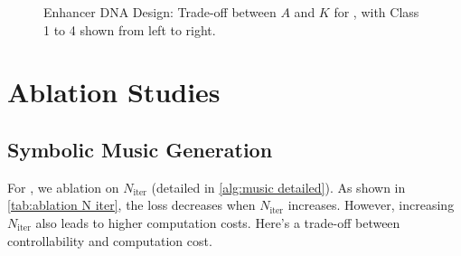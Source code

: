 \begin{figure}[ht]
    \centering
    \hspace{0.01cm}
    \hspace{0.01cm}
     \hspace{0.01cm}
    \caption{Enhancer DNA Design: Trade-off between $A$ and $K$ for \xtsampling, with Class 1 to 4 shown from left to right. }
    \label{fig:app DNA trade-off xt sampling}
\end{figure}























\section{Ablation Studies}
\subsection{Symbolic Music Generation}

For \xcleansampling, we ablation on $N_{\text{iter}}$ (detailed in \cref{alg:music detailed}). As shown in \cref{tab:ablation N iter}, the loss decreases when $N_{\text{iter}}$ increases. However, increasing $N_{\text{iter}}$ also leads to higher computation costs. Here's a trade-off between controllability and computation cost.


